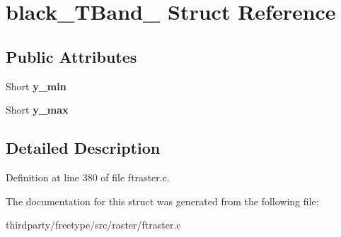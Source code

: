 \hypertarget{structblack___t_band__}{}\section{black\+\_\+\+T\+Band\+\_\+ Struct Reference}
\label{structblack___t_band__}
\subsection*{Public Attributes}
\begin{DoxyCompactItemize}
\item 
\mbox{\label{structblack___t_band___a694ff5296ee30dacec40851d4485b3e6}} 
Short {\bfseries y\+\_\+min}
\item 
\mbox{\label{structblack___t_band___a2182cdc2dbff5d5bcd4e15497c72e792}} 
Short {\bfseries y\+\_\+max}
\end{DoxyCompactItemize}


\subsection{Detailed Description}


Definition at line 380 of file ftraster.\+c.



The documentation for this struct was generated from the following file\+:\begin{DoxyCompactItemize}
\item 
thirdparty/freetype/src/raster/ftraster.\+c\end{DoxyCompactItemize}
